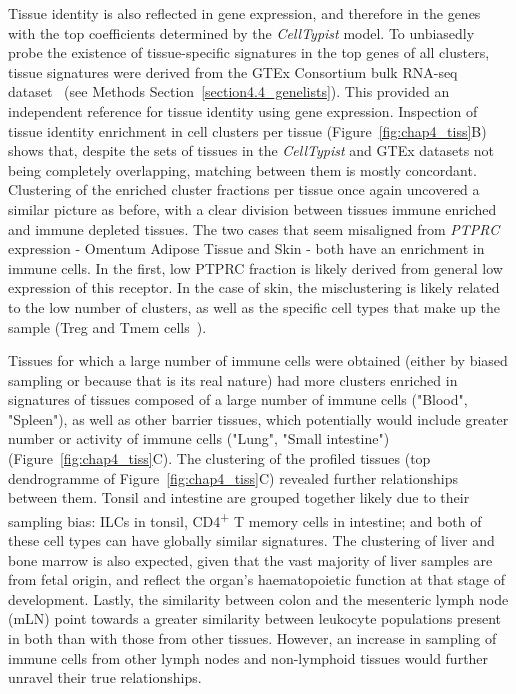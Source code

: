 Tissue identity is also reflected in gene expression, and therefore in the genes with the top coefficients determined by the \textit{CellTypist} model. To unbiasedly probe the existence of tissue-specific signatures in the top genes of all clusters, tissue signatures were derived from the GTEx Consortium bulk RNA-seq dataset~\citep{consortium_genotype-tissue_2015} (see Methods Section~\ref{section4.4_genelists}). This provided an independent reference for tissue identity using gene expression. Inspection of tissue identity enrichment in cell clusters per tissue (Figure~\ref{fig:chap4_tiss}B) shows that, despite the sets of tissues in the \textit{CellTypist} and GTEx datasets not being completely overlapping, matching between them is mostly concordant. Clustering of the enriched cluster fractions per tissue once again uncovered a similar picture as before, with a clear division between tissues immune enriched and immune depleted tissues. The two cases that seem misaligned from \textit{PTPRC} expression - Omentum Adipose Tissue and Skin - both have an enrichment in immune cells. In the first, low PTPRC fraction is likely derived from general low expression of this receptor. In the case of skin, the misclustering is likely related to the low number of clusters, as well as the specific cell types that make up the sample (Treg and Tmem cells~\citep{miragaia_single-cell_2019}). 

Tissues for which a large number of immune cells were obtained (either by biased sampling or because that is its real nature) had more clusters enriched in signatures of tissues composed of a large number of immune cells ("Blood", "Spleen"), as well as other barrier tissues, which potentially would include greater number or activity of immune cells ("Lung", "Small intestine") (Figure~\ref{fig:chap4_tiss}C). The clustering of the profiled tissues (top dendrogramme of Figure~\ref{fig:chap4_tiss}C) revealed further relationships between them. Tonsil and intestine are grouped together likely due to their sampling bias: ILCs in tonsil, CD4\textsuperscript{+} T memory cells in intestine; and both of these cell types can have globally similar signatures. The clustering of liver and bone marrow is also expected, given that the vast majority of liver samples are from fetal origin, and reflect the organ's haematopoietic function at that stage of development. Lastly, the similarity between colon and the mesenteric lymph node (mLN) point towards a greater similarity between leukocyte populations present in both than with those from other tissues. However, an increase in sampling of immune cells from other lymph nodes and non-lymphoid tissues would further unravel their true relationships.

